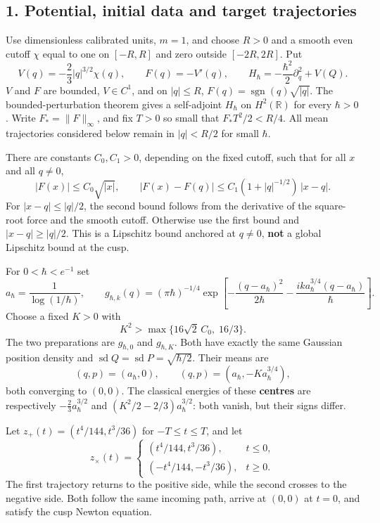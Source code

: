 \documentclass[11pt,a4paper]{article}
\begin{document}
\subsection{1. Potential, initial data and target
trajectories}\label{potential-initial-data-and-target-trajectories}

Use dimensionless calibrated units, \(m=1\), and choose \(R>0\) and a
smooth even cutoff \(\chi\) equal to one on \([-R,R]\) and zero outside
\([-2R,2R]\). Put \[
 V(q)=-\frac23|q|^{3/2}\chi(q),\qquad
 F(q)=-V'(q),\qquad
 H_\hbar=-\frac{\hbar^2}{2}\partial_q^2+V(Q).\tag{1}
\] \(V\) and \(F\) are bounded, \(V\in C^1\), and on \(|q|\le R\),
\(F(q)=\operatorname{sgn}(q)\sqrt{|q|}\). The bounded-perturbation
theorem gives a self-adjoint \(H_\hbar\) on \(H^2(\mathbb R)\) for every
\(\hbar>0\). Write \(F_*=\|F\|_\infty\), and fix \(T>0\) so small that
\(F_*T^2/2<R/4\). All mean trajectories considered below remain in
\(|q|<R/2\) for small \(\hbar\).

There are constants \(C_0,C_1>0\), depending on the fixed cutoff, such
that for all \(x\) and all \(q\ne0\), \[
 |F(x)|\le C_0\sqrt{|x|},\qquad
 |F(x)-F(q)|
   \le C_1(1+|q|^{-1/2})\,|x-q|.\tag{2}
\] For \(|x-q|\le |q|/2\), the second bound follows from the derivative
of the square-root force and the smooth cutoff. Otherwise use the first
bound and \(|x-q|\ge |q|/2\). This is a Lipschitz bound anchored at
\(q\ne0\), \textbf{not} a global Lipschitz bound at the cusp.

For \(0<\hbar<e^{-1}\) set \[
 a_\hbar=\frac1{\log(1/\hbar)},\qquad
 g_{\hbar,k}(q)=(\pi\hbar)^{-1/4}
 \exp\!\left[-\frac{(q-a_\hbar)^2}{2\hbar}
     -\frac{i k a_\hbar^{3/4}(q-a_\hbar)}{\hbar}\right].\tag{3}
\] Choose a fixed \(K>0\) with
\[K^2>\max\{16\sqrt2\,C_0,\;16/3\}.\tag{4}\] The two preparations are
\(g_{\hbar,0}\) and \(g_{\hbar,K}\). Both have exactly the same Gaussian
position density and
\(\operatorname{sd}Q=\operatorname{sd}P=\sqrt{\hbar/2}\). Their means
are \[
 (q,p)=(a_\hbar,0),\qquad
 (q,p)=(a_\hbar,-K a_\hbar^{3/4}),\tag{5}
\] both converging to \((0,0)\). The classical energies of these
\textbf{centres} are respectively \(-\frac23a_\hbar^{3/2}\) and
\((K^2/2-2/3)a_\hbar^{3/2}\): both vanish, but their signs differ.

Let \(z_+(t)=(t^4/144,t^3/36)\) for \(-T\le t\le T\), and let \[
 z_\times(t)=
 \begin{cases}
  (t^4/144,t^3/36),&t\le0,\\
  (-t^4/144,-t^3/36),&t\ge0.
 \end{cases}\tag{6}
\] The first trajectory returns to the positive side, while the second
crosses to the negative side. Both follow the same incoming path, arrive
at \((0,0)\) at \(t=0\), and satisfy the cusp Newton equation.
\end{document}
